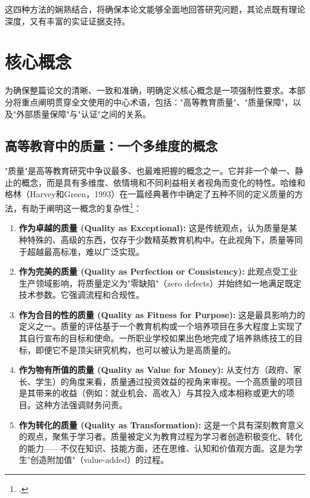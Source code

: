 这四种方法的娴熟结合，将确保本论文能够全面地回答研究问题，其论点既有理论深度，又有丰富的实证证据支持。



\section{核心概念}
\label{sec:khai_niem_cot_loi}

为确保整篇论文的清晰、一致和准确，明确定义核心概念是一项强制性要求。本部分将重点阐明贯穿全文使用的中心术语，包括："高等教育质量"、"质量保障"，以及"外部质量保障"与"认证"之间的关系。

\subsection{高等教育中的质量：一个多维度的概念}
\label{subsec:khai_niem_chat_luong}

"质量"是高等教育研究中争议最多、也最难把握的概念之一。它并非一个单一、静止的概念，而是具有多维度、依情境和不同利益相关者视角而变化的特性。哈维和格林（Harvey和Green，1993）在一篇经典著作中确定了五种不同的定义质量的方法，有助于阐明这一概念的复杂性\footcite{HarveyGreen1993}：

\begin{enumerate}
    \item \textbf{作为卓越的质量 (Quality as Exceptional):} 这是传统观点，认为质量是某种特殊的、高级的东西，仅存于少数精英教育机构中。在此视角下，质量等同于超越最高标准，难以广泛实现。
    
    \item \textbf{作为完美的质量 (Quality as Perfection or Consistency):} 此观点受工业生产领域影响，将质量定义为"零缺陷"（zero defects）并始终如一地满足既定技术参数。它强调流程和合规性。
    
    \item \textbf{作为合目的性的质量 (Quality as Fitness for Purpose):} 这是最具影响力的定义之一。质量的评估基于一个教育机构或一个培养项目在多大程度上实现了其自行宣布的目标和使命。一所职业学校如果出色地完成了培养熟练技工的目标，即便它不是顶尖研究机构，也可以被认为是高质量的。
    
    \item \textbf{作为物有所值的质量 (Quality as Value for Money):} 从支付方（政府、家长、学生）的角度来看，质量通过投资效益的视角来审视。一个高质量的项目是其带来的收益（例如：就业机会、高收入）与其投入成本相称或更大的项目。这种方法强调财务问责。
    
    \item \textbf{作为转化的质量 (Quality as Transformation):} 这是一个具有深刻教育意义的观点，聚焦于学习者。质量被定义为教育过程为学习者创造积极变化、转化的能力——不仅在知识、技能方面，还在思维、认知和价值观方面。这是为学生"创造附加值"（value-added）的过程。
\end{enumerate}


